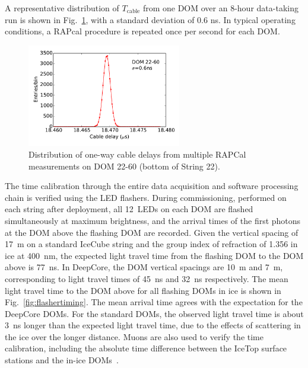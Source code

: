 \noindent A representative distribution of $T_{\mathrm{cable}}$ from one DOM over an 8-hour
data-taking run is shown in Fig.~\ref{fig:rapcal_cable_len}, with a
standard deviation of 0.6 ns. In typical operating conditions, a RAPcal procedure
is repeated once per second for each DOM.

\begin{figure}[!h]
 \centering
 \includegraphics[width=0.6\textwidth]{graphics/dom/rapcal/tcal_hist_22-60.pdf}
 \caption{Distribution of one-way cable delays from multiple RAPCal
   measurements on DOM 22-60 (bottom of String 22).}
 \label{fig:rapcal_cable_len}
\end{figure}

The time calibration through the entire data acquisition and software
processing chain is verified using the LED flashers. During
commissioning, performed on each string after deployment, all 12~LEDs on each DOM are flashed simultaneously at
maximum brightness, and the arrival times of the first photons at the DOM above the flashing DOM
are recorded. Given the vertical spacing of 17~m on a standard IceCube
string and the group index of
refraction of  1.356 in ice at 400~nm, the expected light travel time
from the flashing DOM to the DOM above is 77~ns. In DeepCore, the DOM
vertical spacings are 10~m and 7~m, corresponding to light travel
times of 45~ns and 32~ns respectively. The mean light travel
time to the DOM above for all flashing DOMs in ice is shown in
Fig.~\ref{fig:flashertiming}. The mean arrival time agrees with the
expectation for the DeepCore DOMs. For the standard DOMs, the observed
light travel time is about 3~ns longer than the expected light travel
time, due to the effects of scattering in the ice over the longer distance. Muons are also used to
verify the time calibration, including the absolute time difference
between the IceTop surface stations and the in-ice DOMs~\cite{IC3:perf}.

